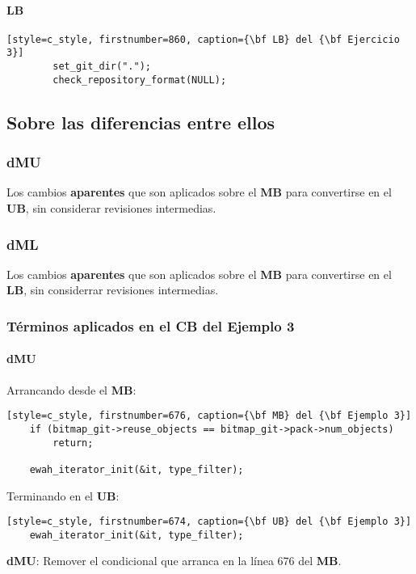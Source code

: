 \paragraph{LB}
\begin{lstlisting}[style=c_style, firstnumber=860, caption={\bf LB} del {\bf Ejercicio 3}]
		set_git_dir(".");
		check_repository_format(NULL);
\end{lstlisting}

\subsection{Sobre las diferencias entre ellos}
\subsubsection{dMU}
Los cambios {\bf aparentes} que son aplicados sobre el {\bf MB} para convertirse en el {\bf UB}, sin considerar
revisiones intermedias.

\subsubsection{dML}
Los cambios {\bf aparentes} que son aplicados sobre el {\bf MB} para convertirse en el {\bf LB}, sin considerrar
revisiones intermedias.

\subsubsection{Términos aplicados en el CB del Ejemplo 3}
\paragraph{dMU}
Arrancando desde el {\bf MB}:
\begin{lstlisting}[style=c_style, firstnumber=676, caption={\bf MB} del {\bf Ejemplo 3}]
	if (bitmap_git->reuse_objects == bitmap_git->pack->num_objects)
		return;

	ewah_iterator_init(&it, type_filter);
\end{lstlisting}
Terminando en el {\bf UB}:
\begin{lstlisting}[style=c_style, firstnumber=674, caption={\bf UB} del {\bf Ejemplo 3}]
	ewah_iterator_init(&it, type_filter);
\end{lstlisting}

{\bf dMU}: Remover el condicional que arranca en la línea 676 del {\bf MB}.

